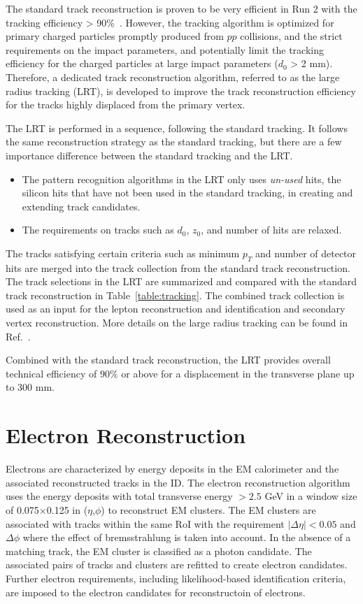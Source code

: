 The standard track reconstruction is proven to be very efficient in Run 2 with the tracking efficiency > 90\%~\cite{Aaboud:2017all}. However, the tracking algorithm is optimized for primary charged particles promptly produced from $pp$ collisions, and the strict requirements on the impact parameters, \dzero and \zzero potentially limit the tracking efficiency for the charged particles at large impact parameters ($d_{0}$ > 2 mm). Therefore, a dedicated track reconstruction algorithm, referred to as the large radius tracking (LRT), is developed to improve the track reconstruction efficiency for the tracks highly displaced from the primary vertex.

The LRT is performed in a sequence, following the standard tracking. It follows the same reconstruction strategy as the standard tracking, but there are a few importance difference between the standard tracking and the LRT.

\begin{itemize}
	\item The pattern recognition algorithms in the LRT only uses \textit{un-used} hits, the silicon hits that have not been used in the standard tracking, in creating and extending track candidates.
	\item The requirements on tracks such as $d_{0}$, $z_{0}$, and number of hits are relaxed.
\end{itemize}

The tracks satisfying certain criteria such as minimum $p_{T}$ and number of detector hits are merged into the track collection from the standard track reconstruction. The track selections in the LRT are summarized and compared with the standard track reconstruction in Table~\ref{table:tracking}. The combined track collection is used as an input for the lepton reconstruction and identification and secondary vertex reconstruction. More details on the large radius tracking can be found in Ref.~\cite{ATL-PHYS-PUB-2017-014}.

Combined with the standard track reconstruction, the LRT provides overall technical efficiency of $90\%$ or above for a displacement in the transverse plane up to 300 \si{\milli\meter}.


\section{Electron Reconstruction}
\label{sec:reco:lep}

Electrons are characterized by energy deposits in the EM calorimeter and the associated reconstructed tracks in the ID. The electron reconstruction algorithm uses the energy deposits with total transverse energy $>2.5$ \si{\GeV} in a window size of 0.075$\times$0.125 in ($\eta$,$\phi$) to reconstruct EM clusters. The EM clusters are associated with tracks within the same RoI with the requirement $|\Delta\eta|<0.05$ and $\Delta\phi$ where the effect of bremsstrahlung is taken into account. In the absence of a matching track, the EM cluster is classified as a photon candidate. The associated pairs of tracks and clusters are refitted to create electron candidates. Further electron requirements, including likelihood-based identification criteria, are imposed to the electron candidates for reconstructoin of electrons.

